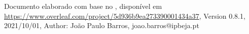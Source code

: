 \documentclass[PT]{ipbeja-format}
\begin{document}
\setcounter{page}{1}
\folhacapa %
\folharosto %
\frontmatter %

\clearpage

\clearpage


\clearpage


\clearpage
\indicegeral  
\clearpage
\indicedefiguras %
\clearpage
\indicedetabelas %
\clearpage
\indicedelistagens %

% 

\mainmatter  \pagestyle{ruled} %





\clearpage
\printbibliography[heading=bibintoc]
\apendices

\anexos



\vfill
{\footnotesize Documento elaborado com base no , disponível em \url{https://www.overleaf.com/project/5d936b9ea273390001434a37}, Version 0.8.1, 2021/10/01, Author: João Paulo Barros, joao.barros@ipbeja.pt}
\end{document}
